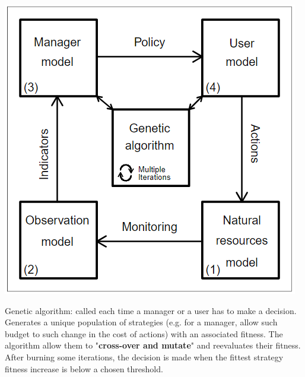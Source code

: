 \documentclass[12pt]{article}
\begin{document}
\begin{center}
\includegraphics[scale=0.5]{GMSE-diagram.PNG}
\end{center}

Genetic algorithm: called each time a manager or a user has to make a decision. Generates a unique population of strategies (e.g. for a manager, allow such budget to such change in the cost of actions) with an associated fitness. The algorithm allow them to "\textbf{cross-over and mutate}" and reevaluates their fitness. After burning some iterations, the decision is made when the fittest strategy fitness increase is below a chosen threshold.\\
\end{document}
